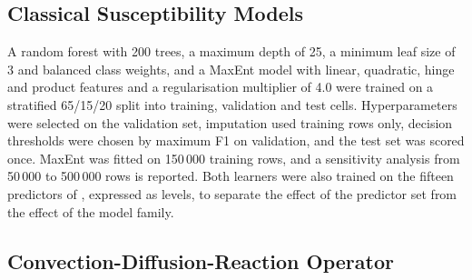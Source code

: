 \documentclass[journal]{IEEEtran}
\begin{document}
\subsection{Classical Susceptibility Models}
A random forest \cite{breiman2001} with 200 trees, a maximum depth of 25, a minimum leaf size of 3 and balanced class weights, and a MaxEnt model \cite{phillips2006} with linear, quadratic, hinge and product features and a regularisation multiplier of 4.0 were trained on a stratified 65/15/20 split into training, validation and test cells. Hyperparameters were selected on the validation set, imputation used training rows only, decision thresholds were chosen by maximum F1 on validation, and the test set was scored once. MaxEnt was fitted on 150\,000 training rows, and a sensitivity analysis from 50\,000 to 500\,000 rows is reported. Both learners were also trained on the fifteen predictors of \cite{biswas2025}, expressed as levels, to separate the effect of the predictor set from the effect of the model family.

\subsection{Convection-Diffusion-Reaction Operator}
\label{sec:cdr}
\end{document}
